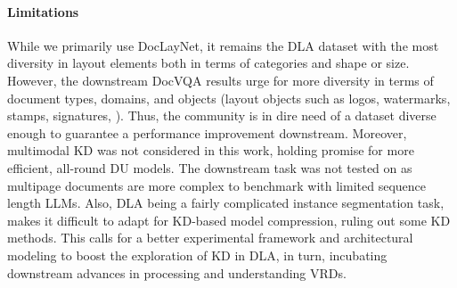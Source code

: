 \documentclass[runningheads]{llncs}
\begin{document}
\paragraph{Limitations}
While we primarily use DocLayNet, it remains the DLA dataset with the most diversity in layout elements both in terms of categories and shape or size. However, the downstream DocVQA results urge for more diversity in terms of document types, domains, and objects (\eg layout objects such as logos, watermarks, stamps, signatures, \etc). Thus, the community is in dire need of a dataset diverse enough to guarantee a performance improvement downstream. Moreover, multimodal KD was not considered in this work, holding promise for more efficient, all-round DU models.
The downstream task was not tested on \cite{VanLandeghem2023dude} as multipage documents are more complex to benchmark with limited sequence length LLMs.
Also, DLA being a fairly complicated instance segmentation task, makes it difficult to adapt for KD-based model compression, ruling out some KD methods. This calls for a better experimental framework and architectural modeling to boost the exploration of KD in DLA, in turn, incubating downstream advances in processing and understanding VRDs.

{\small
  
  
}


\end{document}
